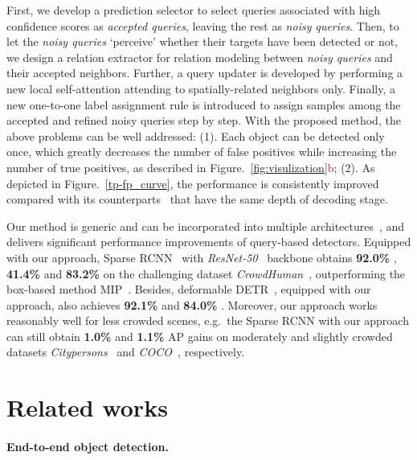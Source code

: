 \documentclass[final]{cvpr}
\begin{document}
First, we develop a prediction selector to select queries associated with high confidence scores as \emph{accepted queries}, leaving the rest as \emph{noisy queries}. Then, to let the \emph{noisy queries} `perceive' whether their targets have been detected or not, we design a relation extractor for relation modeling between \emph{noisy queries} and their accepted neighbors. Further, a query updater is developed by performing a new local self-attention attending to spatially-related neighbors only. Finally, a new one-to-one label assignment rule is introduced to assign samples among the accepted and refined noisy queries step by step. With the proposed method, the above problems can be well addressed: (1). Each object can be detected only once, which greatly decreases the number of false positives while increasing the number of true positives, as described in Figure.~\ref{fig:visulization}\textcolor{red}{b}; (2). As depicted in Figure.~\ref{tp-fp_curve}, the performance is consistently improved compared with its counterparts~\cite{sun2020sparse,zhu2021deformable} that have the same depth of decoding stage. 






Our method is generic and can be incorporated into multiple architectures~\cite{sun2020sparse, zhu2021deformable}, and delivers significant performance improvements of query-based detectors. Equipped with our approach, Sparse RCNN~\cite{sun2020sparse} with \emph{ResNet-50}~\cite{he2016deep} backbone obtains \textbf{92.0\%} , \textbf{41.4\%}  and \textbf{83.2\%}  on the challenging dataset \emph{CrowdHuman}~\cite{shao2018crowdhuman}, outperforming the box-based method MIP~\cite{chu2020detection}. Besides, deformable DETR~\cite{zhu2021deformable}, equipped with our approach, also achieves \textbf{92.1\%}  and \textbf{84.0\%} . Moreover, our approach works reasonably well for less crowded scenes, e.g.\ the Sparse RCNN with our approach can still obtain \textbf{1.0\%}  and \textbf{1.1\%} AP gains on moderately and slightly crowded datasets \emph{Citypersons}~\cite{zhang2017citypersons} and \emph{COCO}~\cite{lin2014microsoft}, respectively.

\vspace{-0.2cm}
\section{Related works}

\vspace{-0.2cm}
\paragraph{End-to-end object detection.}
\end{document}
